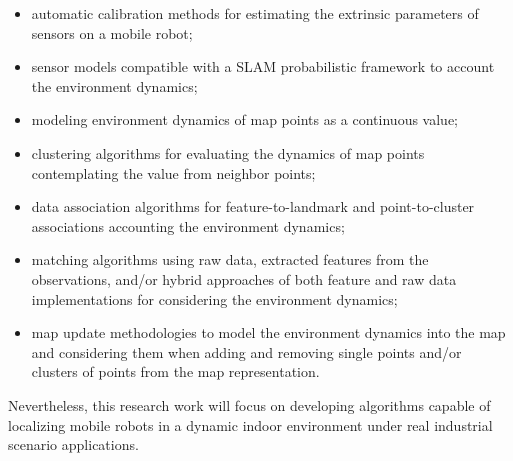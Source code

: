 \begin{itemize}[nosep]
\item automatic calibration methods for estimating the extrinsic parameters of sensors on a mobile robot;
\item sensor models compatible with a \gls{SLAM} probabilistic framework to account the environment dynamics;
\item modeling environment dynamics of map points as a continuous value;
\item clustering algorithms for evaluating the dynamics of map points contemplating the value from neighbor points;
\item data association algorithms for feature-to-landmark and point-to-cluster associations accounting the environment dynamics;
\item matching algorithms using raw data, extracted features from the observations, and/or hybrid approaches of both feature and raw data implementations for considering the environment dynamics;
\item map update methodologies to model the environment dynamics into the map and considering them when adding and removing single points and/or clusters of points from the map representation.
\end{itemize}

Nevertheless, this research work will focus on developing algorithms capable of localizing mobile robots in a dynamic indoor environment under real industrial scenario applications.
